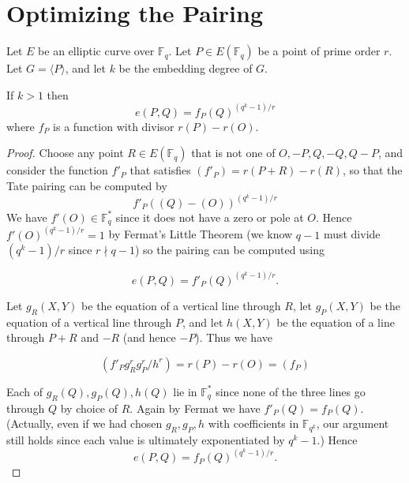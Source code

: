 \chapter{Optimizing the Pairing}

Let $E$ be an elliptic curve over $\mathbb{F}_q$.
Let $P \in E(\mathbb{F}_q)$ be a point of prime order $r$.
Let $G = \langle P \rangle$, and let $k$ be the embedding degree of $G$.

\begin{theorem}
If $k > 1$ then
\[
e(P,Q) = f_P(Q)^{(q^k-1)/r}
\]
where $f_P$ is a function with divisor $r(P) - r(O)$.
\end{theorem}

\begin{proof}
Choose any point $R \in E(\mathbb{F}_q)$ that is not one of
$O, -P, Q, -Q, Q - P$,
and consider the function $f'_P$ that satisfies $(f'_P) = r(P+R) - r(R)$,
so that the Tate pairing can be computed by
\[
f'_P((Q)-(O))^{(q^k-1)/r}
\]
We have $f'(O) \in \mathbb{F}_q^*$ since it does not have a zero or pole
at $O$. Hence
$f'(O)^{(q^k-1)/r} = 1$ by Fermat's Little Theorem (we know $q-1$ must
divide $(q^k - 1)/r$ since $r\nmid q-1$) so the pairing can be computed using

\[ e(P,Q) = f'_P(Q)^{(q^k-1)/r} . \]

Let $g_R(X,Y)$ be the equation of a vertical line through $R$,
let $g_P(X,Y)$ be the equation of a vertical line through $P$,
and let $h(X,Y)$ be the equation of a line through $P+R$ and $-R$ (and hence
$-P$).
Thus we have

\[ (f'_P g_R^r g_P^r / h^r) = r (P) - r(O) = (f_P) \]

Each of $g_R(Q), g_P(Q), h(Q)$ lie in $\mathbb{F}_q^*$ since none
of the three lines go through $Q$ by choice of $R$.
Again by Fermat we have $f'_P(Q) = f_P(Q)$. (Actually, even if we
had chosen $g_R, g_P, h$ with coefficients in $\mathbb{F}_{q^k}$, our
argument still holds since each value is ultimately exponentiated by
$q^k-1$.)
Hence
\[e(P,Q) = f_P(Q)^{(q^k-1)/r} . \]
\end{proof}
